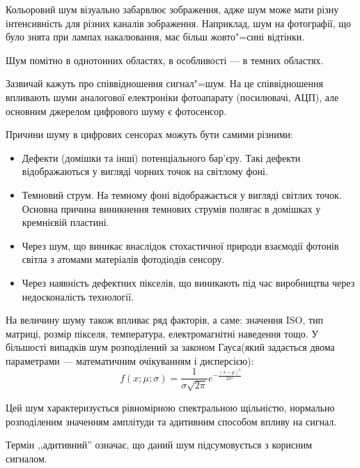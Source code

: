 \documentclass{diploma}
\begin{document}
      Кольоровий шум візуально забарвлює зображення, адже шум може мати різну
      інтенсивність для різних каналів зображення.
      Наприклад, шум на фотографії, що було знята при лампах накалювання, має
      більш жовто"=сині відтінки.\cite{honsales-woods}

      Шум помітно в однотонних областях, в особливості --- в темних областях.

      Зазвичай кажуть про співвідношення сигнал"=шум.
      На це співвідношення впливають шуми аналогової електроніки фотоапарату
      (посилювачі, АЦП), але основним джерелом цифрового шуму є фотосенсор.

      Причини шуму в цифрових сенсорах можуть бути самими різними:
      \begin{itemize}
        \item Дефекти (домішки та інші) потенціального бар’єру.
          Такі дефекти відображаються у вигляді чорних точок на світлому фоні.
        \item Темновий струм.
          На темному фоні відображається у вигляді світлих точок.
          Основна причина виникнення темнових струмів полягає в домішках у
          кремнієвій пластині.
        \item Через шум, що виникає внаслідок стохастичної природи взаємодії
          фотонів світла з атомами матеріалів фотодіодів сенсору.
        \item Через наявність дефектних пікселів, що виникають під час
          виробництва через недосконалість технології.
      \end{itemize}

      На величину шуму також впливає ряд факторів, а саме: значення ISO, тип
      матриці, розмір пікселя, температура, електромагнітні наведення тощо.
      У більшості випадків шум розподілений за законом Гауса(який задається
      двома параметрами --- математичним очікуванням і дисперсією):
      \begin{equation}
        f\left( x; \mu; \sigma \right) = \frac{1}{\sigma \sqrt{2 \pi}}
        e^{-\frac{\left( x - \mu \right)^2}{2 \sigma^2}}
        \label{eq:gaussian-blur}
      \end{equation}

      Цей шум характеризується рівномірною спектральною щільністю, нормально
      розподіленим значенням амплітуди та адитивним способом впливу на сигнал.

      Термін ,,адитивний'' означає, що даний шум підсумовується з
      корисним сигналом.
\end{document}
